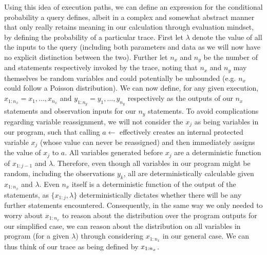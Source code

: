 Using this idea of execution paths, we can define an expression for the conditional probability a query defines,
albeit in a complex and somewhat abstract manner that only really retains meaning in our calculation through
evaluation mindset, by defining the probability of a particular trace.  First let $\lambda$ denote the value of all the 
inputs to the query (including both parameters and
data as we will now have no explicit distinction between the two).  Further let
$n_x$ and $n_y$ be the number of \sample and \observe statements
respectively invoked by the trace, noting that $n_x$ and $n_y$ may themselves be random variables and could
potentially be unbounded (e.g. $n_x$ could follow a Poisson distribution).
We can now define, for any given execution, $x_{1:n_x} = x_1,\dots,x_{n_x}$ and $y_{1:n_y} = y_1,\dots,y_{n_y}$ respectively as the
outputs of our $n_x$ \sample statements and observation inputs for our $n_y$ \observe statements.
To avoid complications regarding variable reassignment, we will not consider the $x_j$ as being variables
in our program, such that calling $a \leftarrow$ effectively creates an internal protected variable $x_j$
(whose value can never be reassigned) and then immediately assigns the value of $x_j$ to $a$.
All variables generated before $x_{j}$ are a deterministic function of $x_{1:j-1}$ and $\lambda$.  Therefore, 
even though all variables in our program might be random, including the observations $y_k$, all
are deterministically calculable given $x_{1:n_{x}}$ and $\lambda$.  Even $n_x$ itself is a deterministic function
of the output of the \sample statements, as $\{x_{1:j},\lambda\}$ deterministically dictates whether there will be any
further \sample statements encountered.  Consequently, in the same way
we only needed to worry about $x_{1:n_x}$ to reason about the distribution over the program outputs for
our simplified case, we can reason about the distribution on all variables in program (for a given $\lambda$) 
through considering $x_{1:n_x}$ in our general case.  We can thus think of our trace as being defined by $x_{1:n_x}$.

